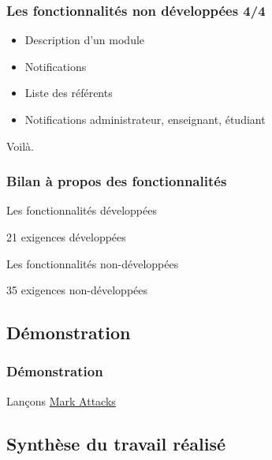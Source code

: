 \documentclass{beamer}
\begin{document}
    \begin{frame}
      \frametitle{Les fonctionnalités non développées 4/4}
      \begin{block}{}
        \begin{itemize}
          \item Description d'un module
          \item Notifications
          \item Liste des référents
          \item Notifications administrateur, enseignant, étudiant
        \end{itemize}
        \begin{center}
          Voilà.
        \end{center}
      \end{block}
    \end{frame}
    \begin{frame}
      \frametitle{Bilan à propos des fonctionnalités}
      \begin{block}{Les fonctionnalités développées}
        \begin{center}
          21 exigences développées
        \end{center}
      \end{block}
      \begin{block}{Les fonctionnalités non-développées}
        \begin{center}
          35 exigences non-développées
        \end{center}
      \end{block}
    \end{frame}

    \subsection{Démonstration}
    \begin{frame}
      \frametitle{Démonstration}
      \begin{center}
        {\LARGE Lançons \href{http://localhost/m2test6/markattaks-tmp/website/}{Mark Attacks}}
      \end{center}
    \end{frame}
    
    \subsection{Synthèse du travail réalisé}
    
\end{document}
